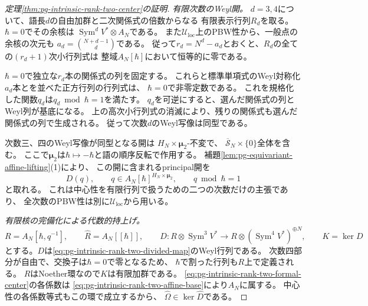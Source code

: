 \begin{proof}[定理\ref{thm:pg-intrinsic-rank-two-center}の証明]
\emph{有限次数のWeyl開。}
$d=3,4$について、語長$d$の自由加群と二次関係式の倍数からなる
有限表示行列$R_d$を取る。
$\hbar=0$でその余核は
$\operatorname{Sym}^dV^*\otimes A_N$である。
また$\mathcal U_{\mathrm{loc}}$上のPBW性から、一般点の余核の次元も
$a_d=\binom{N+d-1}{d}$である。
従って$r_d=N^d-a_d$とおくと、$R_d$の全ての$(r_d+1)$次小行列式は
整域$A_N[\hbar]$において恒等的に零である。

$\hbar=0$で独立な$r_d$本の関係式の列を固定する。
これらと標準単項式のWeyl対称化$a_d$本とを並べた正方行列の行列式は、
$\hbar=0$で非零定数である。
これを規格化した関数$q_d$は$q_d\bmod\hbar=1$を満たす。
$q_d$を可逆にすると、選んだ関係式の列とWeyl列が基底になる。
上の高次小行列式の消滅により、残りの関係式も選んだ関係式の列で生成される。
従って次数$d$のWeyl写像は同型である。

次数三、四のWeyl写像が同型となる開は
$H_N\times\boldsymbol\mu_2$-不変で、
$\overline{\mathcal S}_N\times\{0\}$全体を含む。
ここで$\boldsymbol\mu_2$は$\hbar\mapsto-\hbar$と語の順序反転で作用する。
補題\ref{lem:pg-equivariant-affine-lifting}(1)により、
この開に含まれるprincipal開を
\begin{equation}
 D(q),\qquad q\in A_N[\hbar]^{H_N\times\boldsymbol\mu_2},
 \qquad q\bmod\hbar=1
 \label{eq:pg-intrinsic-rank-two-uniform-weyl-open}
\end{equation}
と取れる。
これは中心性を有限行列で扱うための二つの次数だけの主張であり、
全次数のPBW性は別に$\mathcal U_{\mathrm{loc}}$から用いる。

\emph{有限核の完備化による代数的持上げ。}
\begin{equation}
 R=A_N[\hbar,q^{-1}],\qquad
 \widehat R=A_N[[\hbar]],\qquad
 D:R\otimes\operatorname{Sym}^3V^*
     \longrightarrow R\otimes(\operatorname{Sym}^4V^*)^{\oplus N},
 \qquad K=\ker D
 \label{eq:pg-intrinsic-rank-two-finite-kernel}
\end{equation}
とする。$D$は\eqref{eq:pg-intrinsic-rank-two-divided-map}のWeyl行列である。
次数四部分が自由で、交換子は$\hbar=0$で零となるため、
$\hbar$で割った行列も$R$上で定義される。
$R$はNoether環なので$K$は有限加群である。
\eqref{eq:pg-intrinsic-rank-two-formal-center}の各係数は
\eqref{eq:pg-intrinsic-rank-two-affine-base}により$A_N$に属する。
中心性の各係数等式もこの環で成立するから、
$\widehat\Omega\in\ker\widehat D$である。


\end{proof}
